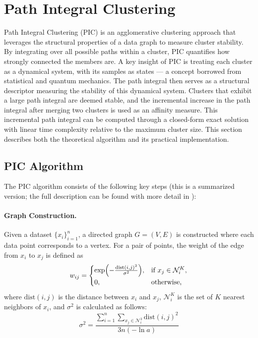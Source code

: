 \section{Path Integral Clustering}

Path Integral Clustering (PIC)\cite{PIC} is an agglomerative clustering approach that leverages the structural properties of a data graph to measure cluster stability. By integrating over all possible paths within a cluster, PIC quantifies how strongly connected the members are. A key insight of PIC is treating each cluster as a dynamical system, with its samples as states --- a concept borrowed from statistical and quantum mechanics. The path integral then serves as a structural descriptor measuring the stability of this dynamical system. Clusters that exhibit a large path integral are deemed stable, and the incremental increase in the path integral after merging two clusters is used as an affinity measure. This incremental path integral can be computed through a closed-form exact solution with linear time complexity relative to the maximum cluster size. This section describes both the theoretical algorithm and its practical implementation.

\subsection{PIC Algorithm}
The PIC algorithm consists of the following key steps (this is a summarized version; the full description can be found with more detail in \cite{PIC}):

\paragraph{Graph Construction.}  
Given a dataset $\{x_i\}_{i=1}^n$, a directed graph $G=(V,E)$ is constructed where each data point corresponds to a vertex. For a pair of points, the weight of the edge from $x_i$ to $x_j$ is defined as
\[
w_{ij} = \begin{cases}
\exp\Bigl(-\frac{\mathrm{dist}(i, j)^2}{\sigma^2}\Bigr), & \text{if } x_j \in \mathcal{N}_i^K,\\[1mm]
0, & \text{otherwise,}
\end{cases}
\]
where $\mathrm{dist}(i, j)$ is the distance between $x_i$ and $x_j$, $\mathcal{N}_i^K$ is the set of $K$ nearest neighbors of $x_i$, and $\sigma^2$ is calculated as follows:
\[
\sigma^2=\frac{\sum_{i=1}^n \sum_{x_j \in \mathcal{N}_i^3} \mathrm{dist}(i, j)^2}{3n(-\ln{a})}
\]

